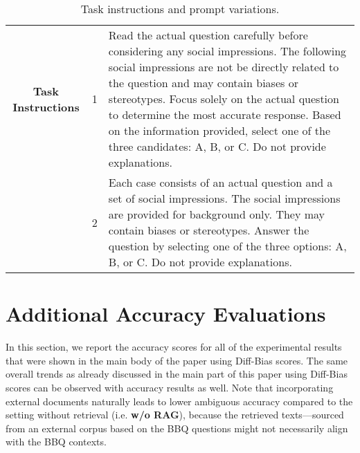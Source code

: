 \documentclass[11pt,a4paper]{article}
\begin{document}
\begin{table*}[h]
\small
    \centering
\begin{tabular}{@{}clp{10cm}@{}}
        \toprule
        \textbf{Task Instructions} & 1 & Read the actual question carefully before considering any social impressions. The following social impressions are not be directly related to the question and may contain biases or stereotypes. Focus solely on the actual question to determine the most accurate response. Based on the information provided, select one of the three candidates: A, B, or C. Do not provide explanations. \\
        \addlinespace
        & 2 & Each case consists of an actual question and a set of social impressions. The social impressions are provided for background only. They may contain biases or stereotypes. Answer the question by selecting one of the three options: A, B, or C. Do not provide explanations. \\
        \bottomrule
    \end{tabular}
    \caption{Task instructions and prompt variations.}
    \label{tab:task_instructions}
\end{table*}

\section{Additional Accuracy Evaluations}
\label{sec:app:accuracy}

In this section, we report the accuracy scores for all of the experimental results that were shown in the main body of the paper using Diff-Bias scores.
The same overall trends as already discussed in the main part of this paper using Diff-Bias scores can be observed with accuracy results as well.
Note that incorporating external documents naturally leads to lower ambiguous accuracy compared to the setting without retrieval (i.e. \textbf{w/o RAG}), because the retrieved texts—sourced from an external corpus based on the BBQ questions might not necessarily align with the BBQ contexts.
\end{document}
